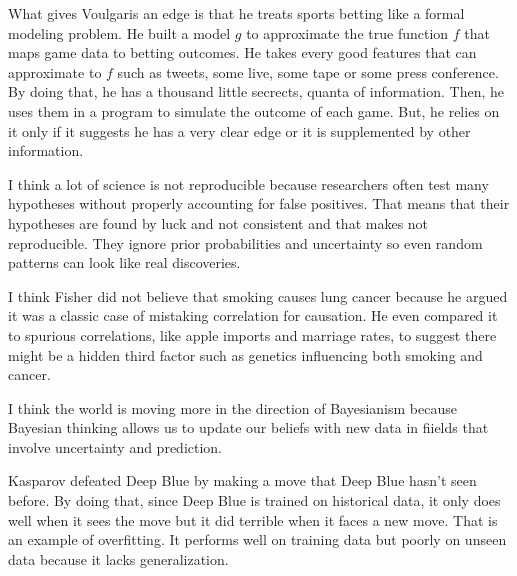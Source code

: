 \documentclass[12pt]{article}
\begin{document}
\begin{enumerate}

What gives Voulgaris an edge is that he treats sports betting like a formal modeling problem. He built a model $g$ to approximate the true function $f$ that maps game data to betting outcomes. He takes every good features that can approximate to $f$ such as tweets, some live, some tape or some press conference. By doing that, he has a thousand little secrects, quanta of information. Then, he uses them in a program to simulate the outcome of each game. But, he relies on it only if it suggests he has a very clear edge or it is supplemented by other information. 


I think a lot of science is not reproducible because researchers often test many hypotheses without properly accounting for false positives.  That means that their hypotheses are found by luck and not consistent and that makes not reproducible. They ignore prior probabilities and uncertainty so even random patterns can look like real discoveries.


I think Fisher did not believe that smoking causes lung cancer because he argued it was a classic case of mistaking correlation for causation. He even compared it to spurious correlations, like apple imports and marriage rates, to suggest there might be a hidden third factor such as genetics influencing both smoking and cancer.


I think the world is moving more in the direction of Bayesianism because Bayesian thinking allows us to update our beliefs with new data in fiields that involve uncertainty and prediction.


Kasparov defeated Deep Blue by making a move that Deep Blue hasn't seen before. By doing that, since Deep Blue is trained on historical data, it only does well when it sees the move but it did terrible when it faces a new move. That is an example of overfitting. It performs well on training data but poorly on unseen data because it lacks generalization. 


\end{enumerate}
\end{document}
